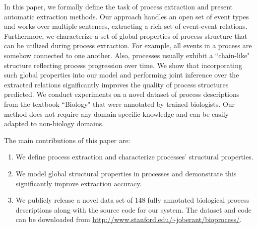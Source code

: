 
In this paper, we formally define the task of process extraction and present automatic extraction methods. 
Our approach handles an open set of event types and works over multiple sentences, extracting a rich set of event-event relations.
Furthermore, we characterize a set of global properties of process structure that can be utilized during process extraction. 
For example, all events in a process are somehow connected to one another. Also, processes usually exhibit a ``chain-like" structure reflecting process progression over time. 
We show that incorporating such global properties into our model and performing joint inference over the extracted relations significantly improves the quality of process structures predicted.  
We conduct experiments on a novel dataset of process descriptions from the textbook ``Biology" \cite{CampbellReece} that were annotated by trained biologists. Our method does not require any domain-specific knowledge and can be easily adapted to non-biology domains.

The main contributions of this paper are:
\begin{enumerate} [itemsep=0pt] 
\item We define process extraction and characterize processes' structural properties.
\item We model global structural properties in processes and demonstrate this significantly improve extraction accuracy.
\item We publicly release a novel data set of 148 fully annotated biological process descriptions along with the source code for our system. The dataset and code can be downloaded from \small{\url{http://www.stanford.edu/~joberant/bioprocess/}}.
\end{enumerate}
